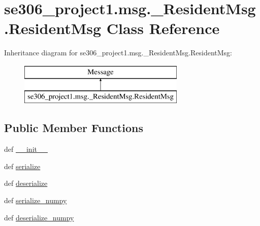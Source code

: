 \hypertarget{classse306__project1_1_1msg_1_1__ResidentMsg_1_1ResidentMsg}{\section{se306\-\_\-project1.\-msg.\-\_\-\-Resident\-Msg.\-Resident\-Msg Class Reference}
\label{classse306__project1_1_1msg_1_1__ResidentMsg_1_1ResidentMsg}
}
Inheritance diagram for se306\-\_\-project1.\-msg.\-\_\-\-Resident\-Msg.\-Resident\-Msg\-:\begin{figure}[H]
\begin{center}
\leavevmode
\includegraphics[height=2.000000cm]{classse306__project1_1_1msg_1_1__ResidentMsg_1_1ResidentMsg}
\end{center}
\end{figure}
\subsection*{Public Member Functions}
\begin{DoxyCompactItemize}
\item 
def \hyperlink{classse306__project1_1_1msg_1_1__ResidentMsg_1_1ResidentMsg_a478d608feb54103df63be92f56924b28}{\-\_\-\-\_\-init\-\_\-\-\_\-}
\item 
def \hyperlink{classse306__project1_1_1msg_1_1__ResidentMsg_1_1ResidentMsg_a8e5f5cd5b2bd07c32ed735978ffeb4ee}{serialize}
\item 
def \hyperlink{classse306__project1_1_1msg_1_1__ResidentMsg_1_1ResidentMsg_ac11744354ea648bc3df1aa92e8c799d7}{deserialize}
\item 
def \hyperlink{classse306__project1_1_1msg_1_1__ResidentMsg_1_1ResidentMsg_a86f69bc9eaa9d1b5c9ffdb581266e584}{serialize\-\_\-numpy}
\item 
def \hyperlink{classse306__project1_1_1msg_1_1__ResidentMsg_1_1ResidentMsg_a8608a64edc2229ed55f0669caf76153d}{deserialize\-\_\-numpy}
\end{DoxyCompactItemize}
